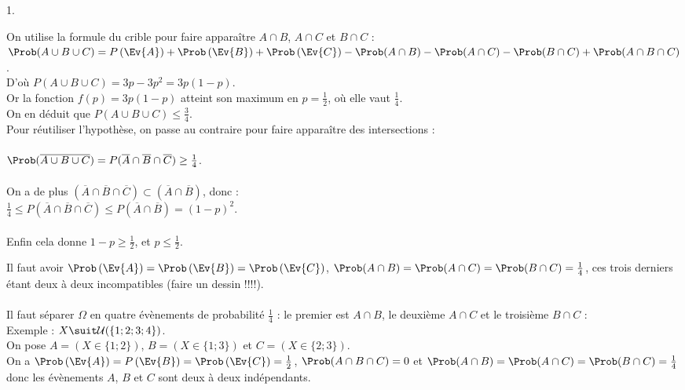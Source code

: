 \documentclass[11pt]{article}%
\begin{document}
\begin{exercice}
\begin{noliste}{1.}
 \item On utilise la formule du crible pour faire apparaître $A \cap
B$, $A \cap C$ et $B \cap C$ : \\
 $\Prob(A \cup B \cup C) = P \left(\Ev{ A}\right) + \Prob\left(\Ev{
B}\right) + \Prob\left(\Ev{C}\right) - \Prob(A \cap B) - \Prob( A \cap
C) - \Prob( B \cap C) + \Prob(A \cap B \cap C)$. \\
 D'où $P ( A \cup B \cup C) = 3 p - 3 p^{2} = 3p (1-p)$. \\
 Or la fonction $f(p) = 3 p (1-p)$ atteint son maximum en $p =
\frac{1}{2}$, où elle vaut $\frac{1}{4}$. \\
 On en déduit que $P ( A \cup B \cup C) \leq \frac{3}{4}$. \\
 Pour réutiliser l'hypothèse, on passe au contraire pour faire
apparaître des intersections : \\
\\
 $\Prob( \overline{ A \cup B \cup C}) = P ( \overline{A} \cap
\overline{B} \cap \overline{C} ) \geq \frac{1}{4}$. \\
\\
 On a de plus $( \overline{A} \cap \overline{B} \cap \overline{C} )
\subset ( \overline{A} \cap \overline{B} )$, donc : \\
 $\frac{1}{4} \leq P ( \overline{A} \cap \overline{B} \cap \overline{C}
) \leq P ( \overline{A} \cap \overline{B} ) = (1-p)^{2}$. \\
\\
 Enfin cela donne $1-p \geq \frac{1}{2}$, et $p \leq \frac{1}{2}$. \\
\item Il faut avoir $\Prob\left(\Ev{ A}\right) = \Prob\left(\Ev{
      B}\right) = \Prob\left(\Ev{ C}\right)$, $\Prob( A \cap B) =
  \Prob( A \cap C) = \Prob( B \cap C) = \frac{1}{4}$, ces trois
  derniers étant
  deux à deux incompatibles (faire un dessin !!!!). \\
  \\
  Il faut séparer $\Omega$ en quatre évènements de probabilité
  $\frac{1}{4}$ : le premier est $A \cap B$, le deuxième $A \cap C$ et
  le
  troisième $B \cap C$ : \\
  Exemple : $X \suit \mathcal{U} ( \{ 1 ; 2 ; 3 ; 4 \} )$. \\
  On pose $A = ( X \in \{ 1 ; 2 \} )$, $B = ( X \in \{ 1 ; 3\})$ et $C
  =
  ( X \in \{ 2 ; 3\} )$. \\
  On a $\Prob\left(\Ev{ A}\right) = P \left(\Ev{B}\right) =
  \Prob\left(\Ev{ C}\right) = \frac{1}{2}$, $\Prob( A \cap B \cap C) =
  0$ et $\Prob( A \cap B) = \Prob( A \cap C) = \Prob( B \cap C) =
  \frac{1}{4}$ donc les évènements $A$, $B$ et $C$ sont deux à deux
  indépendants.
\end{noliste}
\end{exercice}
\end{document}
